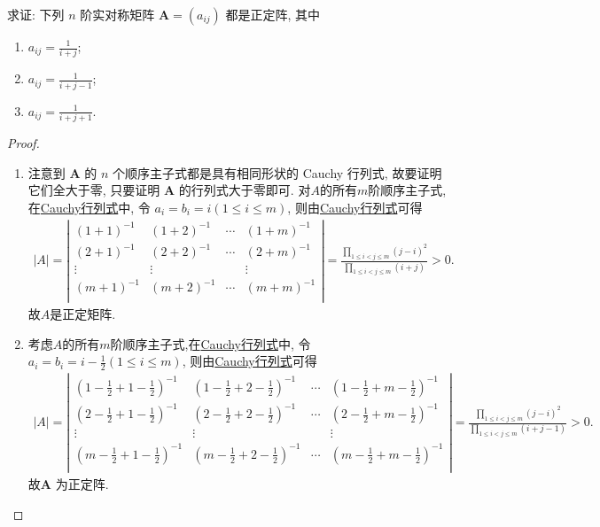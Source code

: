 \documentclass[../../main.tex]{subfiles}
\begin{document}
\begin{example}\label{example:例8.48}
求证: 下列 \(n\) 阶实对称矩阵 \(\boldsymbol{A}=(a_{ij})\) 都是正定阵, 其中
\begin{enumerate}[(1)]
\item \(a_{ij}=\frac{1}{i + j}\);
\item \(a_{ij}=\frac{1}{i + j - 1}\);
\item \(a_{ij}=\frac{1}{i + j + 1}\).
\end{enumerate}
\end{example}
\begin{proof}
\begin{enumerate}[(1)]
\item 注意到 \(\boldsymbol{A}\) 的 \(n\) 个顺序主子式都是具有相同形状的 Cauchy 行列式, 故要证明它们全大于零, 只要证明 \(\boldsymbol{A}\) 的行列式大于零即可. 对$A$的所有$m$阶顺序主子式,在\hyperref[Cauchy行列式]{Cauchy行列式}中, 令 \(a_i = b_i = i(1\leq i\leq m)\), 则由\hyperref[Cauchy行列式]{Cauchy行列式}可得
\begin{align*}
|A|=\left| \begin{matrix}
(1+1)^{-1}&		(1+2)^{-1}&		\cdots&		(1+m)^{-1}\\
(2+1)^{-1}&		(2+2)^{-1}&		\cdots&		(2+m)^{-1}\\
\vdots&		\vdots&		&		\vdots\\
(m+1)^{-1}&		(m+2)^{-1}&		\cdots&		(m+m)^{-1}\\
\end{matrix} \right|=\frac{\prod\limits_{1\leqslant i<j\leqslant m}{\left( j-i \right) ^2}}{\prod\limits_{1\leqslant i<j\leqslant m}{\left( i+j \right)}}>0.
\end{align*}
故$A$是正定矩阵.

\item 考虑$A$的所有$m$阶顺序主子式,在\hyperref[Cauchy行列式]{Cauchy行列式}中, 令 \(a_i = b_i = i-\frac{1}{2}(1\leq i\leq m)\), 则由\hyperref[Cauchy行列式]{Cauchy行列式}可得
\begin{align*}
|A|=\left| \begin{matrix}
(1-\frac{1}{2}+1-\frac{1}{2})^{-1}&		(1-\frac{1}{2}+2-\frac{1}{2})^{-1}&		\cdots&		(1-\frac{1}{2}+m-\frac{1}{2})^{-1}\\
(2-\frac{1}{2}+1-\frac{1}{2})^{-1}&		(2-\frac{1}{2}+2-\frac{1}{2})^{-1}&		\cdots&		(2-\frac{1}{2}+m-\frac{1}{2})^{-1}\\
\vdots&		\vdots&		&		\vdots\\
(m-\frac{1}{2}+1-\frac{1}{2})^{-1}&		(m-\frac{1}{2}+2-\frac{1}{2})^{-1}&		\cdots&		(m-\frac{1}{2}+m-\frac{1}{2})^{-1}\\
\end{matrix} \right|=\frac{\prod\limits_{1\leqslant i<j\leqslant m}{\left( j-i \right) ^2}}{\prod\limits_{1\leqslant i<j\leqslant m}{\left( i+j-1 \right)}}>0.
\end{align*}
故\(\boldsymbol{A}\) 为正定阵.


\end{enumerate}
\end{proof}
\end{document}

